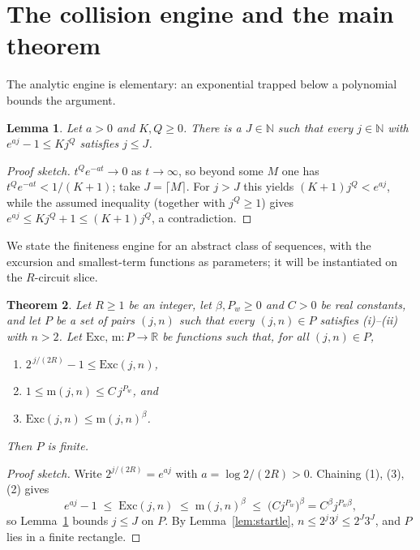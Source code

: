\documentclass[11pt]{amsart}
\theoremstyle{plain}
\newtheorem{theorem}{Theorem}[section]
\newtheorem{lemma}[theorem]{Lemma}
\theoremstyle{definition}
\theoremstyle{remark}
\newcommand{\N}{\mathbb{N}}
\begin{document}
\section{The collision engine and the main theorem}\label{sec:main}

The analytic engine is elementary: an exponential trapped below a
polynomial bounds the argument.

\begin{lemma}\label{lem:collision}
Let $a>0$ and $K,Q\ge 0$.  There is a $J\in\N$ such that every $j\in\N$ with
$e^{aj}-1\le K j^{Q}$ satisfies $j\le J$.
\end{lemma}

\begin{proof}[Proof sketch]
$t^{Q}e^{-at}\to 0$ as $t\to\infty$, so beyond some $M$ one has
$t^{Q}e^{-at}<1/(K+1)$; take $J=\lceil M\rceil$.  For $j>J$ this yields
$(K+1)j^{Q}<e^{aj}$, while the assumed inequality (together with
$j^{Q}\ge 1$) gives $e^{aj}\le K j^{Q}+1\le(K+1)j^{Q}$, a contradiction.
\end{proof}

We state the finiteness engine for an abstract class of sequences, with the
excursion and smallest-term functions as parameters; it will be instantiated
on the $R$-circuit slice.

\begin{theorem}\label{thm:engine}
Let $R\ge 1$ be an integer, let $\beta,P_w\ge 0$ and $C>0$ be real
constants, and let $P$ be a set of pairs $(j,n)$ such that every
$(j,n)\in P$ satisfies (i)--(ii) with $n>2$.  Let
$\mathrm{Exc},\,\mathrm{m}\colon P\to\mathbb{R}$ be functions such that, for
all $(j,n)\in P$,
\begin{enumerate}
\item[(1)] $2^{\,j/(2R)}-1\le\mathrm{Exc}(j,n)$,
\item[(2)] $1\le\mathrm{m}(j,n)\le C\,j^{P_w}$, and
\item[(3)] $\mathrm{Exc}(j,n)\le\mathrm{m}(j,n)^{\beta}$.
\end{enumerate}
Then $P$ is finite.
\end{theorem}

\begin{proof}[Proof sketch]
Write $2^{j/(2R)}=e^{aj}$ with $a=\log 2/(2R)>0$.  Chaining (1), (3), (2)
gives
\[
e^{aj}-1
\;\le\;\mathrm{Exc}(j,n)
\;\le\;\mathrm{m}(j,n)^{\beta}
\;\le\;\bigl(C j^{P_w}\bigr)^{\beta}
= C^{\beta} j^{P_w\beta},
\]
so Lemma~\ref{lem:collision} bounds $j\le J$ on $P$.  By
Lemma~\ref{lem:startle}, $n\le 2^{j}3^{j}\le 2^{J}3^{J}$, and $P$ lies in a
finite rectangle.
\end{proof}
\end{document}
